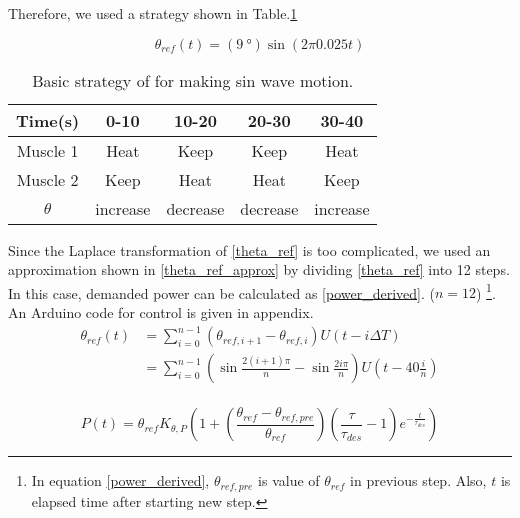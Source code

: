 
Therefore, we used a strategy shown in Table.\ref{table_apc_basic}

\begin{equation}\label{theta_ref}
\theta_{ref}(t)=(\SI{9}{\degree})\sin(2\pi 0.025t)
\end{equation}

\begin{table}[b]
	\caption{Basic strategy of \apc for making sin wave motion.}
	\label{table_apc_basic}
	\begin{center}
		\begin{tabular}{c||c|c|c|c}
			\hline
			Time(s) & 0-10 & 10-20 & 20-30 & 30-40 \\
			\hline
			Muscle 1 & Heat & Keep & Keep & Heat \\
			Muscle 2 & Keep & Heat & Heat & Keep \\
			\hline
			$\theta$ & increase & decrease & decrease & increase \\
			\hline
		\end{tabular}
	\end{center}
\end{table}

Since the Laplace transformation of \eqref{theta_ref} is too complicated, we used an approximation shown in \eqref{theta_ref_approx} by dividing \eqref{theta_ref} into 12 steps. In this case, demanded power can be calculated as \eqref{power_derived}. ($n=12$)
\footnote{In equation \eqref{power_derived}, $\theta_{ref,pre}$ is value of $\theta_{ref}$ in previous step. Also, $t$ is elapsed time after starting new step.}. An Arduino code for control is given in appendix.
\begin{equation} \label{theta_ref_approx}
\begin{aligned} 
\theta_{ref}(t) & = \sum_{i=0}^{n-1}{(\theta_{ref,i+1}-\theta_{ref,i})U(t-i\Delta T)} \\
& = \sum_{i=0}^{n-1}{(\sin{\frac{2(i+1)\pi}{n}}-\sin{\frac{2i\pi}{n}})U(t-40\frac{i}{n})} \\
\end{aligned}
\end{equation}

\begin{equation} \label{power_derived}
P(t)=\theta_{ref}K_{\theta,P}(1+(\frac{\theta_{ref}-\theta_{ref,pre}}{\theta_{ref}})(\frac{\tau}{\tau_{des}}-1)e^{-\frac{t}{\tau_{des}}})
\end{equation}

